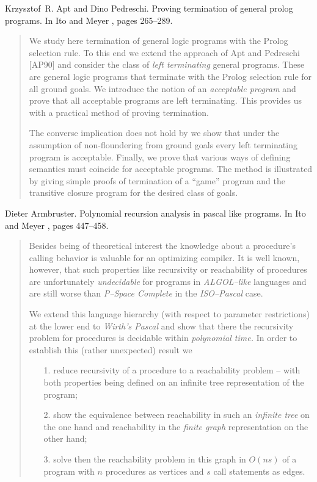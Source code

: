 \begin{thebibliography}{10}

Krzysztof~R. Apt and Dino Pedreschi.
\newblock Proving termination of general prolog programs.
\newblock In Ito and Meyer \cite{TACS91}, pages 265--289.
\begin{quotation}
We study here termination of general logic programs with the Prolog selection
  rule. To this end we extend the approach of Apt and Pedreschi [AP90] and
  consider the class of {\em left terminating\/} general programs. These are
  general logic programs that terminate with the Prolog selection rule for all
  ground goals. We introduce the notion of an {\em acceptable program\/} and
  prove that all acceptable programs are left terminating. This provides us
  with a practical method of proving termination. \par The converse implication
  does not hold by we show that under the assumption of non-floundering from
  ground goals every left terminating program is acceptable. Finally, we prove
  that various ways of defining semantics must coincide for acceptable
  programs. The method is illustrated by giving simple proofs of termination of
  a ``game'' program and the transitive closure program for the desired class
  of goals.
\end{quotation}

Dieter Armbruster.
\newblock Polynomial recursion analysis in pascal like programs.
\newblock In Ito and Meyer \cite{TACS91}, pages 447--458.
\begin{quotation}
Besides being of theoretical interest the knowledge about a procedure's calling
  behavior is valuable for an optimizing compiler. It is well known, however,
  that such properties like recursivity or reachability of procedures are
  unfortunately {\em undecidable} for programs in {\em ALGOL--like} languages
  and are still worse than {\em P--Space Complete} in the {\em ISO--Pascal}
  case. \par We extend this language hierarchy (with respect to parameter
  restrictions) at the lower end to {\em Wirth's Pascal} and show that there
  the recursivity problem for procedures is decidable within {\em polynomial
  time.} In order to establish this (rather unexpected) result we
  \begin{itemize} \item[1.] reduce recursivity of a procedure to a reachability
  problem -- with both properties being defined on an infinite tree
  representation of the program; \item[2.] show the equivalence between
  reachability in such an {\em infinite tree} on the one hand and reachability
  in the {\em finite graph} representation on the other hand; \item[3.] solve
  then the reachability problem in this graph in $O(n s)$ of a program with $n$
  procedures as vertices and $s$ call statements as edges. \end{itemize}
\end{quotation}


\end{thebibliography}
